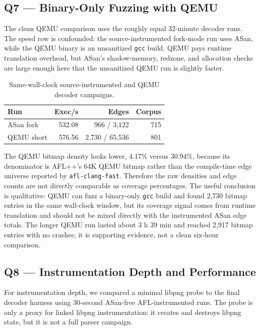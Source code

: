\documentclass[letterpaper,twocolumn,10pt]{article}
\begin{document}
\subsection{Q7 --- Binary-Only Fuzzing with QEMU}
The clean QEMU comparison uses the roughly equal 32-minute decoder runs. The
speed row is confounded: the source-instrumented fork-mode run uses ASan, while
the QEMU binary is an unsanitized \texttt{gcc} build. QEMU pays runtime
translation overhead, but ASan's shadow-memory, redzone, and allocation checks
are large enough here that the unsanitized QEMU run is slightly faster.

\begin{table}[h]
\centering
\small
\begin{tabular}{lrrr}
\toprule
\textbf{Run} & \textbf{Exec/s} & \textbf{Edges} & \textbf{Corpus} \\
\midrule
ASan fork & 532.08 & 966 / 3{,}122 & 715 \\
QEMU short & 576.56 & 2{,}730 / 65{,}536 & 801 \\
\bottomrule
\end{tabular}
\caption{Same-wall-clock source-instrumented and QEMU decoder campaigns.}
\end{table}

The QEMU bitmap density looks lower, 4.17\% versus 30.94\%, because its
denominator is AFL++'s 64K QEMU bitmap rather than the compile-time edge
universe reported by \texttt{afl-clang-fast}. Therefore the raw densities and
edge counts are not directly comparable as coverage percentages. The useful
conclusion is qualitative: QEMU can fuzz a binary-only \texttt{gcc} build and
found 2{,}730 bitmap entries in the same wall-clock window, but its coverage
signal comes from runtime translation and should not be mixed directly with the
instrumented ASan edge totals. The longer QEMU run lasted about 3 h 39 min and
reached 2{,}917 bitmap entries with no crashes; it is supporting evidence, not
a clean six-hour comparison.

\subsection{Q8 --- Instrumentation Depth and Performance}
For instrumentation depth, we compared a minimal libpng probe to the final
decoder harness using 30-second ASan-free AFL-instrumented runs. The probe is
only a proxy for linked libpng instrumentation: it creates and destroys libpng
state, but it is not a full parser campaign.
\end{document}
